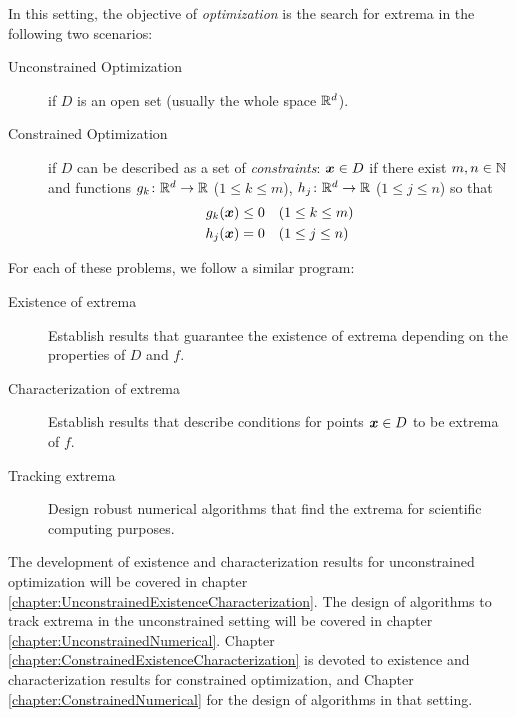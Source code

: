 In this setting, the objective of \emph{optimization} is the search for extrema in the following two scenarios:
\begin{description}
	\item [Unconstrained Optimization] if $D$ is an open set (usually the whole space $\mathbb{R}^d$). 
	\item [Constrained Optimization] if $D$ can be described as a set of \emph{constraints}: $\boldsymbol{x} \in D$ if there exist $m,n \in \mathbb{N}$ and functions $g_k\colon \mathbb{R}^d \to \mathbb{R}$ ($1\leq k \leq m$), $h_j\colon \mathbb{R}^d \to \mathbb{R}$ ($1\leq j \leq n$) so that
	\begin{align*}
	g_k(\boldsymbol{x}) &\leq  0 \quad (1\leq k \leq m) \\
	h_j(\boldsymbol{x}) &= 0     \quad (1\leq j \leq n)
	\end{align*} 
\end{description}
For each of these problems, we follow a similar program:
\begin{description}
	\item[Existence of extrema] Establish results that guarantee the existence of extrema depending on the properties of $D$ and $f$. 
	\item[Characterization of extrema] Establish results that describe conditions for points $\boldsymbol{x} \in D$ to be extrema of $f$.  
	\item[Tracking extrema] Design robust numerical algorithms that find the extrema for scientific computing purposes.
\end{description}
The development of existence and characterization results for unconstrained optimization will be covered in chapter \ref{chapter:UnconstrainedExistenceCharacterization}.  The design of algorithms to track extrema in the unconstrained setting will be covered in chapter \ref{chapter:UnconstrainedNumerical}.  Chapter \ref{chapter:ConstrainedExistenceCharacterization} is devoted to existence and characterization results for constrained optimization, and Chapter \ref{chapter:ConstrainedNumerical} for the design of algorithms in that setting.









